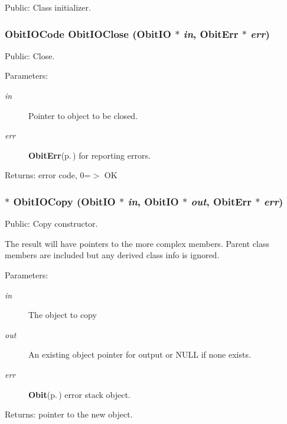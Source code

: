 Public: Class initializer. 

\subsubsection{\setlength{\rightskip}{0pt plus 5cm}Obit\-IOCode Obit\-IOClose ({\bf Obit\-IO} $\ast$ {\em in}, {\bf Obit\-Err} $\ast$ {\em err})}\label{ObitIO_8h_a36}


Public: Close. 

\begin{Desc}
\item[Parameters:]
\begin{description}
\item[{\em in}]Pointer to object to be closed. \item[{\em err}]{\bf Obit\-Err}{\rm (p.\,\pageref{structObitErr})} for reporting errors. \end{description}
\end{Desc}
\begin{Desc}
\item[Returns:]error code, 0=$>$ OK \end{Desc}
\subsubsection{$\ast$ Obit\-IOCopy ({\bf Obit\-IO} $\ast$ {\em in}, {\bf Obit\-IO} $\ast$ {\em out}, {\bf Obit\-Err} $\ast$ {\em err})}\label{ObitIO_8h_a34}


Public: Copy constructor. 

The result will have pointers to the more complex members. Parent class members are included but any derived class info is ignored. \begin{Desc}
\item[Parameters:]
\begin{description}
\item[{\em in}]The object to copy \item[{\em out}]An existing object pointer for output or NULL if none exists. \item[{\em err}]{\bf Obit}{\rm (p.\,\pageref{structObit})} error stack object. \end{description}
\end{Desc}
\begin{Desc}
\item[Returns:]pointer to the new object. \end{Desc}
